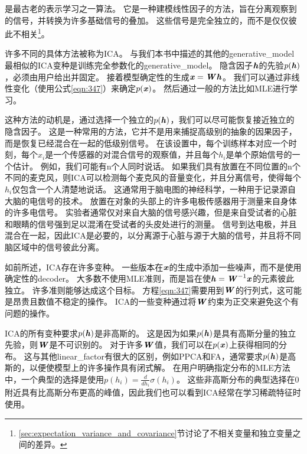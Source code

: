 是最古老的表示学习之一算法\citep{Herault+Ans-1984,Jutten+Herault-91,Comon94,Hyvarinen-1999,Hyvarinen-2001,Hinton-ICA-2001,Teh-2003}。
它是一种建模线性因子的方法，旨在分离观察到的信号，并转换为许多基础信号的叠加。
这些信号是完全独立的，而不是仅仅彼此不相关\footnote{\ref{sec:expectation_variance_and_covariance}节讨论了不相关变量和独立变量之间的差异。}。


许多不同的具体方法被称为\gls{ICA}。
与我们本书中描述的其他的\gls{generative_model}最相似的\gls{ICA}变种是训练完全参数化的\gls{generative_model}\citep{Pham-et-al-1992}。
隐含因子$\boldsymbol{\mathit{h}}$的先验$p(\boldsymbol{\mathit{h}})$，必须由用户给出并固定。
接着模型确定性的生成$\boldsymbol{\mathit{x}} = \boldsymbol{\mathit{W}} \boldsymbol{\mathit{h}}$。
我们可以通过非线性变化（使用公式\eqref{eqn:347}）来确定$p(\boldsymbol{\mathit{x}})$。
然后通过一般的方法比如\gls{MLE}进行学习。


这种方法的动机是，通过选择一个独立的$p(\boldsymbol{\mathit{h}})$，我们可以尽可能恢复接近独立的隐含因子。
这是一种常用的方法，它并不是用来捕捉高级别的抽象的因果因子，而是恢复已经混合在一起的低级别信号。
在该设置中，每个训练样本对应一个时刻，每个$x_i$是一个传感器的对混合信号的观察值，并且每个$h_i$是单个原始信号的一个估计。
例如，我们可能有n个人同时说话。 
如果我们具有放置在不同位置的n个不同的麦克风，则\gls{ICA}可以检测每个麦克风的音量变化，并且分离信号，使得每个$h_i$仅包含一个人清楚地说话。
这通常用于脑电图的神经科学，一种用于记录源自大脑的电信号的技术。
放置在对象的头部上的许多电极传感器用于测量来自身体的许多电信号。
实验者通常仅对来自大脑的信号感兴趣，但是来自受试者的心脏和眼睛的信号强到足以混淆在受试者的头皮处进行的测量。
信号到达电极，并且混合在一起，因此\gls{ICA}是必要的，以分离源于心脏与源于大脑的信号，并且将不同脑区域中的信号彼此分离。


如前所述，\gls{ICA}存在许多变种。
一些版本在$\boldsymbol{\mathit{x}}$的生成中添加一些噪声，而不是使用确定性的\gls{decoder}。
大多数不使用\gls{MLE}准则，而是旨在使$\boldsymbol{\mathit{h}} = \boldsymbol{\mathit{W}}^{-1}\boldsymbol{\mathit{x}}$的元素彼此独立。
许多准则能够达成这个目标。
方程\eqref{eqn:347}需要用到$\boldsymbol{\mathit{W}}$的行列式，这可能是昂贵且数值不稳定的操作。
\gls{ICA}的一些变种通过将$\boldsymbol{\mathit{W}}$约束为正交来避免这个有问题的操作。


\gls{ICA}的所有变种要求$p(\boldsymbol{\mathit{h}})$是非高斯的。
这是因为如果$p(\boldsymbol{\mathit{h}})$是具有高斯分量的独立先验，则$\boldsymbol{\mathit{W}}$是不可识别的。
对于许多$\boldsymbol{\mathit{W}}$值，我们可以在$p(\boldsymbol{\mathit{x}})$上获得相同的分布。 
这与其他\gls{linear_factor}有很大的区别，例如\gls{PPCA}和\gls{FA}，通常要求$p(\boldsymbol{\mathit{h}})$是高斯的，以便使模型上的许多操作具有闭式解。
在用户明确指定分布的\gls{MLE}方法中，一个典型的选择是使用$p(h_i) = \frac{d}{dh_i}\sigma(h_i)$。
这些非高斯分布的典型选择在0附近具有比高斯分布更高的峰值，因此我们也可以看到\gls{ICA}经常在学习稀疏特征时使用。




